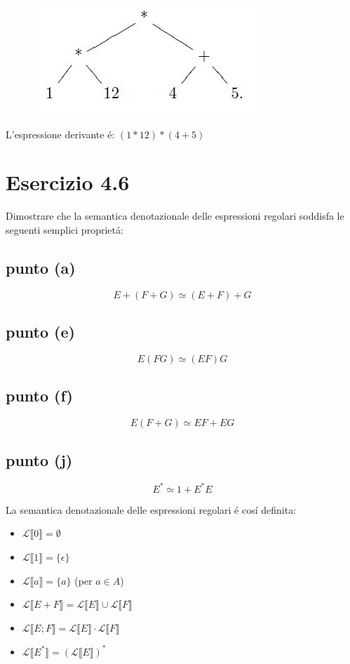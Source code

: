 		\begin{figure}[h]
			\centering
			\includegraphics[scale=0.5]{img/3-13}
		\end{figure}
		
		\sectionline
		
		\qquad L'espressione derivante \'e: $(1*12)*(4+5)$
		
		\newpage
	
	\newpage \section{Esercizio 4.6}
		\qquad Dimostrare che la semantica denotazionale delle espressioni regolari
		soddisfa le seguenti semplici propriet\'a:
		\subsection{punto (a)}
			$$E+(F+G) \simeq (E+F)+G$$
		\subsection{punto (e)}
			$$E(FG) \simeq (EF)G$$
		\subsection{punto (f)}
			$$E(F+G) \simeq EF+EG$$
		\subsection{punto (j)}
			$$E^* \simeq 1+E^*E$$
			
		\sectionline
		
		\qquad La semantica denotazionale delle espressioni regolari \'e cos\'i definita:
		\begin{itemize}
		  \item $\mathcal{L} \llbracket 0 \rrbracket = \emptyset$
		  \item $\mathcal{L} \llbracket 1 \rrbracket = \{\epsilon\}$
		  \item $\mathcal{L} \llbracket a \rrbracket = \{a\}$ (per $a \in A$)
		  \item $\mathcal{L} \llbracket E + F \rrbracket = \mathcal{L} \llbracket E
		  	\rrbracket \cup \mathcal{L} \llbracket F
		  	\rrbracket$
		  \item $\mathcal{L} \llbracket E ; F \rrbracket = \mathcal{L} \llbracket E
		  	\rrbracket \cdot \mathcal{L} \llbracket F
		  	\rrbracket$ 
		  \item $\mathcal{L} \llbracket E^* \rrbracket = (\mathcal{L} \llbracket E
		  	\rrbracket)^*$ 
		\end{itemize}
		
